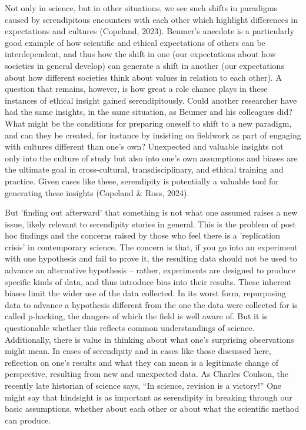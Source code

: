 \documentclass[authordate, empirical]{jote-new-article}
\begin{document}
	Not only in science, but in other situations, we see such shifts in paradigms caused by serendipitous encounters with each other which highlight differences in expectations and cultures (Copeland, 2023). Beumer's anecdote is a particularly good example of how scientific and ethical expectations of others can be interdependent, and thus how the shift in one (our expectations about how societies in general develop) can generate a shift in another (our expectations about how different societies think about values in relation to each other). A question that remains, however, is how great a role chance plays in these instances of ethical insight gained serendipitously. Could another researcher have had the same insights, in the same situation, as Beumer and his colleagues did? What might be the conditions for preparing oneself to shift to a new paradigm, and can they be created, for instance by insisting on fieldwork as part of engaging with cultures different than one's own? Unexpected and valuable insights not only into the culture of study but also into one's own assumptions and biases are the ultimate goal in cross-cultural, transdisciplinary, and ethical training and practice. Given cases like these, serendipity is potentially a valuable tool for generating these insights (Copeland \& Ross, 2024).



	But 'finding out afterward' that something is not what one assumed raises a new issue, likely relevant to serendipity stories in general. This is the problem of post hoc findings and the concerns raised by those who feel there is a 'replication crisis' in contemporary science. The concern is that, if you go into an experiment with one hypothesis and fail to prove it, the resulting data should not be used to advance an alternative hypothesis -- rather, experiments are designed to produce specific kinds of data, and thus introduce bias into their results. These inherent biases limit the wider use of the data collected. In its worst form, repurposing data to advance a hypothesis different from the one the data were collected for is called p-hacking, the dangers of which the field is well aware of. But it is questionable whether this reflects common understandings of science. Additionally, there is value in thinking about what one's surprising observations might mean. In cases of serendipity and in cases like those discussed here, reflection on one's results and what they can mean is a legitimate change of perspective, resulting from new and unexpected data. As Charles Coulson, the recently late historian of science says, “In science, revision is a victory!” One might say that hindsight is as important as serendipity in breaking through our basic assumptions, whether about each other or about what the scientific method can produce.
\end{document}

